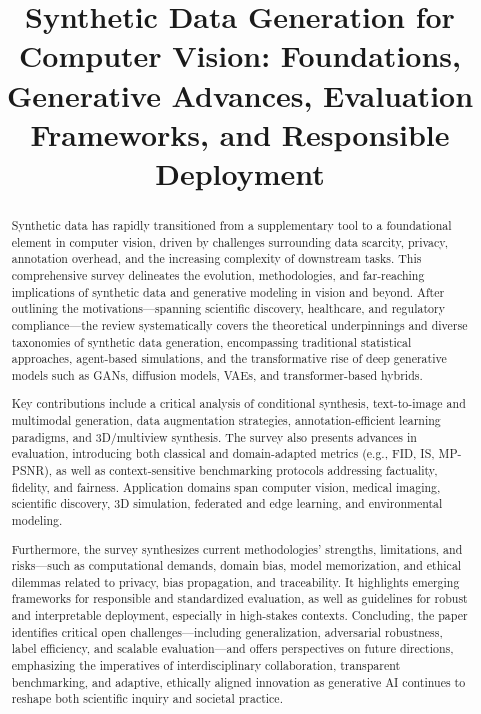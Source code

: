 \title{Synthetic Data Generation for Computer Vision: Foundations, Generative Advances, Evaluation Frameworks, and Responsible Deployment}
\maketitle

\begin{abstract}
Synthetic data has rapidly transitioned from a supplementary tool to a foundational element in computer vision, driven by challenges surrounding data scarcity, privacy, annotation overhead, and the increasing complexity of downstream tasks. This comprehensive survey delineates the evolution, methodologies, and far-reaching implications of synthetic data and generative modeling in vision and beyond. After outlining the motivations—spanning scientific discovery, healthcare, and regulatory compliance—the review systematically covers the theoretical underpinnings and diverse taxonomies of synthetic data generation, encompassing traditional statistical approaches, agent-based simulations, and the transformative rise of deep generative models such as GANs, diffusion models, VAEs, and transformer-based hybrids. 

Key contributions include a critical analysis of conditional synthesis, text-to-image and multimodal generation, data augmentation strategies, annotation-efficient learning paradigms, and 3D/multiview synthesis. The survey also presents advances in evaluation, introducing both classical and domain-adapted metrics (e.g., FID, IS, MP-PSNR), as well as context-sensitive benchmarking protocols addressing factuality, fidelity, and fairness. Application domains span computer vision, medical imaging, scientific discovery, 3D simulation, federated and edge learning, and environmental modeling.

Furthermore, the survey synthesizes current methodologies’ strengths, limitations, and risks—such as computational demands, domain bias, model memorization, and ethical dilemmas related to privacy, bias propagation, and traceability. It highlights emerging frameworks for responsible and standardized evaluation, as well as guidelines for robust and interpretable deployment, especially in high-stakes contexts. Concluding, the paper identifies critical open challenges—including generalization, adversarial robustness, label efficiency, and scalable evaluation—and offers perspectives on future directions, emphasizing the imperatives of interdisciplinary collaboration, transparent benchmarking, and adaptive, ethically aligned innovation as generative AI continues to reshape both scientific inquiry and societal practice.
\end{abstract}

